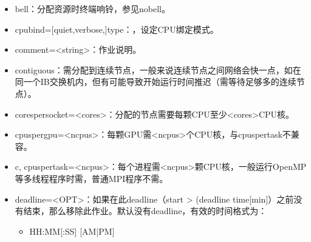 \documentclass[a4paper,12pt,english]{sphinxmanual}
\begin{document}
\begin{itemize}
\begin{itemize}
\item {} 
\sphinxAtStartPar
\sphinxhyphen{}\sphinxhyphen{}begin=now+1hour：1小时后开始。

\item {} 
\sphinxAtStartPar
\sphinxhyphen{}\sphinxhyphen{}begin=now+60：60秒后开始（默认单位为秒）。

\item {} 
\sphinxAtStartPar
\sphinxhyphen{}\sphinxhyphen{}begin=2017\sphinxhyphen{}02\sphinxhyphen{}20T12:34:00：2017\sphinxhyphen{}02\sphinxhyphen{}20T12:34:00开始。

\end{itemize}

\item {} 
\sphinxAtStartPar
\sphinxhyphen{}\sphinxhyphen{}bell：分配资源时终端响铃，参见\sphinxhyphen{}\sphinxhyphen{}no\sphinxhyphen{}bell。

\item {} 
\sphinxAtStartPar
\sphinxhyphen{}\sphinxhyphen{}cpu\sphinxhyphen{}bind={[}quiet,verbose,{]}type：，设定CPU绑定模式。

\item {} 
\sphinxAtStartPar
\sphinxhyphen{}\sphinxhyphen{}comment=<string>：作业说明。

\item {} 
\sphinxAtStartPar
\sphinxhyphen{}\sphinxhyphen{}contiguous：需分配到连续节点，一般来说连续节点之间网络会快一点，如在同一个IB交换机内，但有可能导致开始运行时间推迟（需等待足够多的连续节点）。

\item {} 
\sphinxAtStartPar
\sphinxhyphen{}\sphinxhyphen{}cores\sphinxhyphen{}per\sphinxhyphen{}socket=<cores>：分配的节点需要每颗CPU至少<cores>CPU核。

\item {} 
\sphinxAtStartPar
\sphinxhyphen{}\sphinxhyphen{}cpus\sphinxhyphen{}per\sphinxhyphen{}gpu=<ncpus>：每颗GPU需<ncpus>个CPU核，与\sphinxhyphen{}\sphinxhyphen{}cpus\sphinxhyphen{}per\sphinxhyphen{}task不兼容。

\item {} 
\sphinxAtStartPar
\sphinxhyphen{}c, \sphinxhyphen{}\sphinxhyphen{}cpus\sphinxhyphen{}per\sphinxhyphen{}task=<ncpus>：每个进程需<ncpus>颗CPU核，一般运行OpenMP等多线程程序时需，普通MPI程序不需。

\item {} 
\sphinxAtStartPar
\sphinxhyphen{}\sphinxhyphen{}deadline=<OPT>：如果在此deadline（start > (deadline \sphinxhyphen{} time{[}\sphinxhyphen{}min{]}）之前没有结束，那么移除此作业。默认没有deadline，有效的时间格式为：
\begin{itemize}
\item {} 
\sphinxAtStartPar
HH:MM{[}:SS{]} {[}AM|PM{]}


\end{itemize}
\end{itemize}
\end{document}

